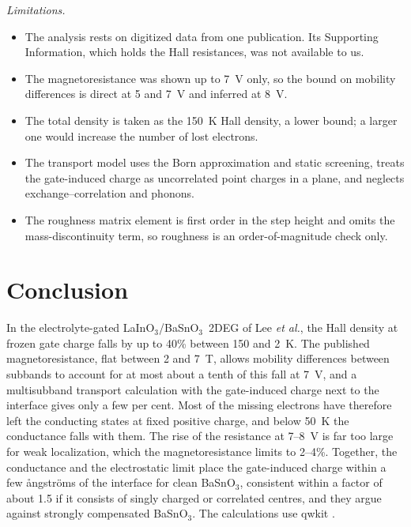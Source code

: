 \documentclass[11pt]{article}
\newcommand{\LIO}{\texorpdfstring{LaInO$_3$}{LaInO3}}
\newcommand{\BSO}{\texorpdfstring{BaSnO$_3$}{BaSnO3}}
\begin{document}
\emph{Limitations.}
\begin{itemize}
\item The analysis rests on digitized data from one publication. Its Supporting Information, which holds the Hall resistances, was not available to us.
\item The magnetoresistance was shown up to 7~V only, so the bound on mobility differences is direct at 5 and 7~V and inferred at 8~V.
\item The total density is taken as the 150~K Hall density, a lower bound; a larger one would increase the number of lost electrons.
\item The transport model uses the Born approximation and static screening, treats the gate-induced charge as uncorrelated point charges in a plane, and neglects exchange--correlation and phonons.
\item The roughness matrix element is first order in the step height and omits the mass-discontinuity term, so roughness is an order-of-magnitude check only.
\end{itemize}

\section{Conclusion}
In the electrolyte-gated \LIO/\BSO\ 2DEG of Lee \emph{et al.}, the Hall density at frozen gate charge falls by up to 40\% between 150 and 2~K. The published magnetoresistance, flat between 2 and 7~T, allows mobility differences between subbands to account for at most about a tenth of this fall at 7~V, and a multisubband transport calculation with the gate-induced charge next to the interface gives only a few per cent. Most of the missing electrons have therefore left the conducting states at fixed positive charge, and below 50~K the conductance falls with them. The rise of the resistance at 7--8~V is far too large for weak localization, which the magnetoresistance limits to 2--4\%. Together, the conductance and the electrostatic limit place the gate-induced charge within a few \aa ngstr\"oms of the interface for clean \BSO, consistent within a factor of about 1.5 if it consists of singly charged or correlated centres, and they argue against strongly compensated \BSO. The calculations use qwkit \cite{qwkit}.



\end{document}
